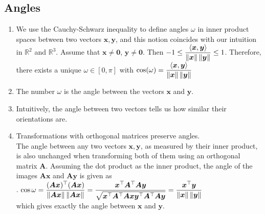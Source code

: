 \subsection{Angles}

\begin{enumerate}
    \item We use the Cauchy-Schwarz inequality to define angles $\omega$ in inner product spaces between two vectors $\bm{x}, \bm{y}$, and this notion coincides with our intuition in $\mathbb{R}^2$ and $\mathbb{R}^3$. 
    Assume that $\bm{x} \neq \bm{0}$, $\bm{y} \neq \bm{0}$. 
    Then
    $
        -1 \leq \dfrac{\langle\bm{x}, \bm{y}\rangle}{\left\| \bm{x} \right\| \left\| \bm{y} \right\|} \leq 1
    $. 
    Therefore, there exists a unique $\omega \in [0, \pi]$ with 
    $
        \cos(\omega) = \dfrac{\langle\bm{x}, \bm{y}\rangle}{\left\| \bm{x} \right\| \left\| \bm{y} \right\|}
    $
    \hfill \cite{mfml/book/mml/Deisenroth-Faisal-Ong}

    \item The number $\omega$ is the angle between the vectors $\bm{x}$ and $\bm{y}$.
    \hfill \cite{mfml/book/mml/Deisenroth-Faisal-Ong}

    \item Intuitively, the angle between two vectors tells us how similar their orientations are.
    \hfill \cite{mfml/book/mml/Deisenroth-Faisal-Ong}

    \item Transformations with orthogonal matrices preserve angles.
    \hfill \cite{mfml/book/mml/Deisenroth-Faisal-Ong}
    \\
    The angle between any two vectors $\bm{x}, \bm{y}$, as measured by their inner product, is also unchanged when transforming both of them using an orthogonal matrix $\bm{A}$. 
    Assuming the dot product as the inner product, the angle of the images $\bm{Ax}$ and $\bm{Ay}$ is given as
    \hfill \cite{mfml/book/mml/Deisenroth-Faisal-Ong}
    \\
    .\hfill
    $
        \cos \omega
        = \dfrac{(\bm{Ax})^\top (\bm{Ax})}{\left\| \bm{Ax} \right\| \left\| \bm{Ax} \right\|}
        = \dfrac{\bm{x}^\top \bm{A}^\top\bm{Ay}}{\sqrt{\bm{x}^\top \bm{A}^\top\bm{Ax} \bm{y}^\top \bm{A}^\top\bm{Ay}}}
        = \dfrac{\bm{x}^\top \bm{y}}{\left\| \bm{x} \right\| \left\| \bm{y} \right\|}
    $
    \hfill \cite{mfml/book/mml/Deisenroth-Faisal-Ong}
    \\
    which gives exactly the angle between $\bm{x}$ and $\bm{y}$.
\end{enumerate}

